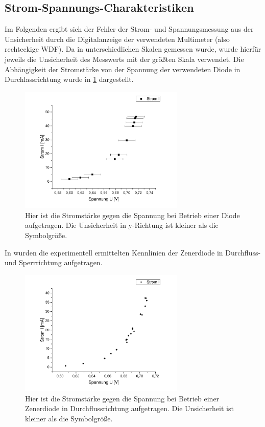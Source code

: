 \documentclass[
	a4paper,
	12pt,
	pagesize,
	ngerman
]{scrartcl}
\begin{document}
	\subsection{Strom-Spannungs-Charakteristiken}
	Im Folgenden ergibt sich der Fehler der Strom- und Spannungsmessung aus der Unsicherheit durch die Digitalanzeige der verwendeten Multimeter (also rechteckige WDF).
	Da in unterschiedlichen Skalen gemessen wurde, wurde hierfür jeweils die Unsicherheit des Messwerts mit der größten Skala verwendet.
	Die Abhängigkeit der Stromstärke von der Spannung der verwendeten Diode in Durchlassrichtung wurde in \cref{Diode} dargestellt.
	\begin{figure}[H]
		\includegraphics[width=0.7\textwidth]{Diode}
		\centering
		\caption{Hier ist die Stromstärke  gegen die Spannung bei Betrieb einer Diode aufgetragen. Die Unsicherheit in y-Richtung ist kleiner als die Symbolgröße.}
		\label{Diode}
		\centering
	\end{figure} 
	In  wurden die experimentell ermittelten Kennlinien der Zenerdiode in Durchfluss- und Sperrrichtung aufgetragen.
	\begin{figure}[H]
		\includegraphics[width=0.7\textwidth]{Zener_Durch}
		\centering
		\caption{Hier ist die Stromstärke  gegen die Spannung bei Betrieb einer Zenerdiode in Durchflussrichtung aufgetragen. Die Unsicherheit ist kleiner als die Symbolgröße.}
		\label{Zener_Durch}
		\centering
	\end{figure}
\end{document}

